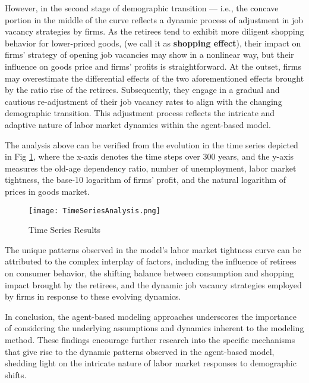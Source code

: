 \documentclass[ %
    final,
    scrbook,
    listoffigures,
    listoftables, 
    glossary]{cu-thesis}
\begin{document}
However, in the second stage of demographic transition --- i.e., the concave portion in the middle of the curve reflects a dynamic process of adjustment in job vacancy strategies by firms. As the retirees tend to exhibit more diligent shopping behavior for lower-priced goods, (we call it as \textbf{shopping effect}), their impact on firms' strategy of opening job vacancies may show in a nonlinear way, but their influence on goods price and firms' profits is straightforward.
At the outset, firms may overestimate the differential effects of the two aforementioned effects brought by the ratio rise of the retirees. Subsequently, they engage in a gradual and cautious re-adjustment of their job vacancy rates to align with the changing demographic transition. This adjustment process reflects the intricate and adaptive nature of labor market dynamics within the agent-based model.

The analysis above can be verified from the evolution in the time series depicted in Fig \ref{figTSA}, where the x-axis denotes the time steps over 300 years, and the y-axis measures the old-age dependency ratio, number of unemployment, labor market tightness, the base-10 logarithm of firms' profit, and the natural logarithm of prices in goods market.
\begin{figure}[h]
\centering
\texttt{[image: TimeSeriesAnalysis.png]}
\caption{Time Series Results}
\label{figTSA}
\end{figure}

The unique patterns observed in the model's labor market tightness curve can be attributed to the complex interplay of factors, including the influence of retirees on consumer behavior, the shifting balance between consumption and shopping impact brought by the retirees, and the dynamic job vacancy strategies employed by firms in response to these evolving dynamics.

In conclusion, the agent-based modeling approaches underscores the importance of considering the underlying assumptions and dynamics inherent to the modeling method. These findings encourage further research into the specific mechanisms that give rise to the dynamic patterns observed in the agent-based model, shedding light on the intricate nature of labor market responses to demographic shifts.
\fi
\end{document}
